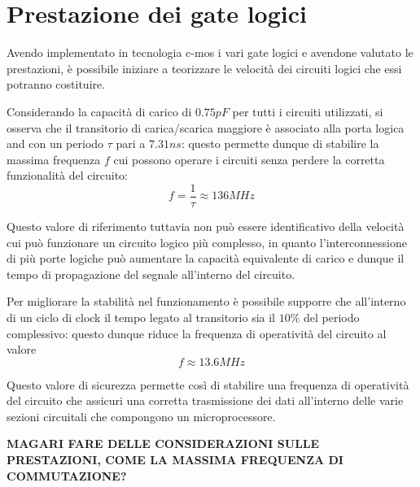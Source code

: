 \section{Prestazione dei gate logici}
	Avendo implementato in tecnologia c-mos i vari gate logici e avendone valutato le prestazioni, è possibile iniziare a teorizzare le velocità dei circuiti logici che essi potranno costituire.
	
	Considerando la capacità di carico di $0.75pF$ per tutti i circuiti utilizzati, si osserva che il transitorio di carica/scarica maggiore è associato alla porta logica and con un periodo $\tau$ pari a $7.31ns$: questo permette dunque di stabilire la massima frequenza $f$ cui possono operare i circuiti senza perdere la corretta funzionalità del circuito:
	\[ f = \frac 1 \tau \approx 136 MHz\]
	
	Questo valore di riferimento tuttavia non può essere identificativo della velocità cui può funzionare un circuito logico più complesso, in quanto l'interconnessione di più porte logiche può aumentare la capacità equivalente di carico e dunque il tempo di propagazione del segnale all'interno del circuito.
	
	Per migliorare la stabilità nel funzionamento è possibile supporre che all'interno di un ciclo di clock il tempo legato al transitorio sia il $10\%$ del periodo complessivo: questo dunque riduce la frequenza di operatività del circuito al valore
	\[ f \approx 13.6 MHz \]
	
	Questo valore di sicurezza permette così di stabilire una frequenza di operatività del circuito che assicuri una corretta trasmissione dei dati all'interno delle varie sezioni circuitali che compongono un microprocessore.
	
	
	























\textbf{MAGARI FARE DELLE CONSIDERAZIONI SULLE PRESTAZIONI, COME LA MASSIMA FREQUENZA DI COMMUTAZIONE?}